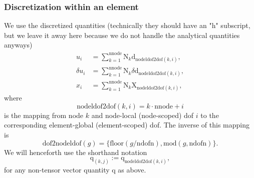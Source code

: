 \documentclass[12pt,a4paper]{article}
\theoremstyle{remark} %
\numberwithin{equation}{section} %
\begin{document}
\subsubsection{Discretization within an element}
We use the discretized quantities (technically they should have an "h" subscript, but we leave it away here because we do not handle the analytical quantities anyways)
\begin{align}
	u_i &= \sum_{k = 1}^{\text{nnode}} \mathrm N_k \mathrm d_{\text{nodeldof2dof}(k, i)} , \\
	\delta u_i &= \sum_{k = 1}^{\text{nnode}} \mathrm N_k \delta \mathrm d_{\text{nodeldof2dof}(k, i)} , \\
	x_i &= \sum_{k = 1}^{\text{nnode}} \mathrm N_k \mathrm X_{\text{nodeldof2dof}(k, i)} ,
\end{align}
where
\begin{equation}
	\text{nodeldof2dof}(k, i) = k \cdot \text{nnode} + i
\end{equation}
is the mapping from node $k$ and node-local (node-scoped) dof $i$ to the corresponding element-global (element-scoped) dof. The inverse of this mapping is
\begin{equation}
	\text{dof2nodeldof}(g) = \{\text{floor}(g/\text{ndofn}), \text{mod}(g, \text{ndofn})\} .
\end{equation}
%
We will henceforth use the shorthand notation
\begin{equation}
	\mathrm q_{(k, j)} := \mathrm q_{\text{nodeldof2dof}(k, i)} ,
\end{equation}
for any non-tensor vector quantity $\mathrm q$ as above.
\end{document}
